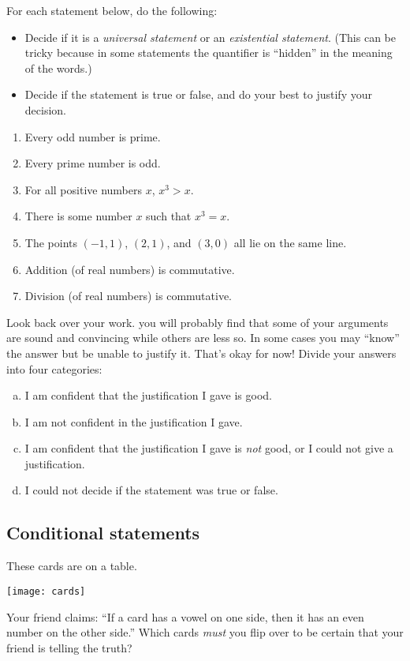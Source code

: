 \begin{thinkpair*}
For each statement below, do the following:
\begin{itemize}
\item
Decide if it is a \emph{universal statement} or an \emph{existential statement}.  (This can be tricky because in some statements the quantifier is ``hidden'' in the meaning of the words.)
\item
Decide if the statement is true or false, and do your best to justify your decision.
\end{itemize}

\begin{enumerate}
\item
Every odd number is prime.
\item
Every prime number is odd.
\item
For all positive numbers $x$, $x^3 > x$.
\item
There is some number $x$ such that $x^3 = x$.
\item
The points $(-1,1)$, $(2,1)$, and $(3,0)$ all lie on the same line.
\item
Addition (of real numbers) is commutative.
\item
Division (of real numbers) is commutative.
\end{enumerate}

Look back over your work.  you will probably find that some of your arguments are sound and convincing while others are less so.  In some cases you may ``know'' the answer but be unable to justify it.  That's okay for now!  Divide your answers into four categories:

\bigskip

\begin{enumerate}[(a)]
\item
I am confident that the justification I gave is good.
\item
I am not confident in the justification I gave.
\item
I am confident that the justification I gave is \emph{not} good, or I could not give a justification.
\item
I could not decide if the statement was true or false.
\end{enumerate}


\end{thinkpair*}

\subsection{Conditional statements}
\begin{problem}
These cards are on a table.
\begin{center}
\texttt{[image: cards]}
\end{center}
Your friend claims: ``If a card has a vowel on one side, then it has an even number on the other side.'' Which cards \emph{must} you flip over to  be certain that your friend is telling the truth?
\end{problem}


